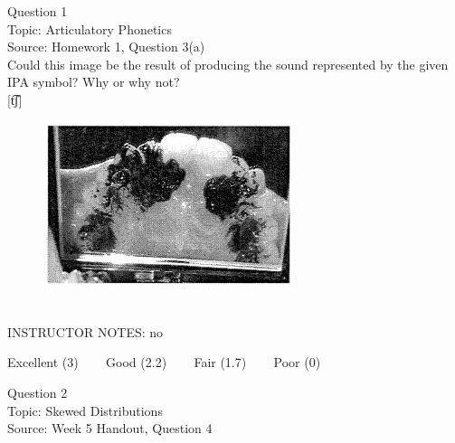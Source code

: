 \documentclass[12pt]{article}
\begin{document}
\begin{center}
\textbf{{\color{violet}{\HUGE 20201116 Monday\\}}}

\textbf{{\color{violet}{\HUGE ALL EXAMS (with notes)\\}}}

\end{center}
\newpage

\begin{center}
\textbf{{\color{blue}{\HUGE START OF EXAM\\}}}

\textbf{{\color{blue}{\HUGE Student ID: 11661\\}}}

\textbf{{\color{blue}{\HUGE 4:00\\}}}

\end{center}
\newpage

{\large Question 1}\\

Topic: Articulatory Phonetics\\
Source: Homework 1, Question 3(a)\\

Could this image be the result of producing the sound represented by the given IPA symbol? Why or why not?\\

{[t͡ʃ]}

\begin{figure}[H]
\includegraphics{../images/staticpalatography_fricative.png}
\end{figure}

~\\
INSTRUCTOR NOTES: no


\vfill
Excellent (3) ~~~ Good (2.2) ~~~ Fair (1.7) ~~~ Poor (0)
\newpage

{\large Question 2}\\

Topic: Skewed Distributions\\
Source: Week 5 Handout, Question 4\\
\end{document}
